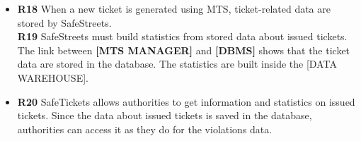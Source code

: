 \documentclass[./main.tex]{subfiles}
\begin{document}

\begin{itemize}
\item
  \textbf{R18} When a new ticket is generated using MTS, ticket-related
  data are stored by SafeStreets.\\
  \textbf{R19} SafeStreets must build statistics from stored data about
  issued tickets.
  \subitem
    The link between \textbf{[MTS MANAGER]} and \textbf{[DBMS]} shows that the ticket data are stored in the database. The statistics are built inside the [DATA WAREHOUSE]. %

\item
  \textbf{R20} SafeTickets allows authorities to get information and
  statistics on issued tickets.
  \subitem
    Since the data about issued tickets is saved in the database, authorities can access it as they do for the violations data.
\end{itemize}
\end{document}
